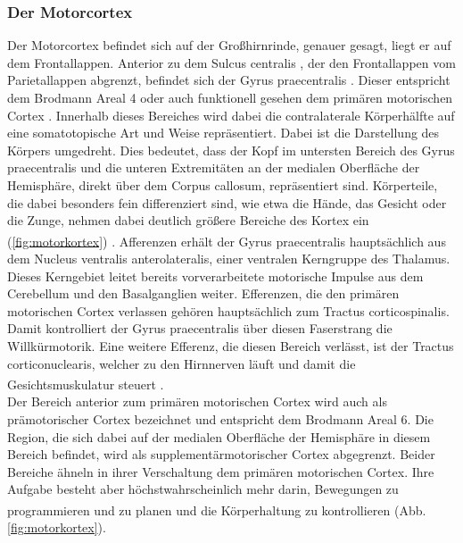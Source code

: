 \documentclass[12pt,a4paper,pdftex]{article}
\begin{document}
\subsubsection*{Der Motorcortex} 
Der Motorcortex befindet sich auf der Großhirnrinde, genauer gesagt, liegt er auf dem Frontallappen. Anterior zu dem Sulcus centralis , der den Frontallappen vom Parietallappen abgrenzt, befindet sich der Gyrus praecentralis . Dieser entspricht dem Brodmann Areal 4 oder auch funktionell gesehen dem primären motorischen Cortex . Innerhalb dieses Bereiches wird dabei die contralaterale Körperhälfte auf eine somatotopische Art und Weise repräsentiert. Dabei ist die Darstellung des Körpers umgedreht. Dies bedeutet, dass der Kopf im untersten Bereich des Gyrus praecentralis und die unteren Extremitäten an der medialen Oberfläche der Hemisphäre, direkt über dem Corpus callosum, repräsentiert sind. Körperteile, die dabei besonders fein differenziert sind, wie etwa die Hände, das Gesicht oder die Zunge, nehmen dabei deutlich größere Bereiche des Kortex ein (\ref{fig:motorkortex}) \textsuperscript{\cite[13]{crossman2014neuroanatomy}}. Afferenzen erhält der Gyrus praecentralis hauptsächlich aus dem Nucleus ventralis anterolateralis, einer ventralen Kerngruppe des Thalamus. Dieses Kerngebiet leitet bereits vorverarbeitete motorische Impulse aus dem Cerebellum und den Basalganglien weiter. Efferenzen, die den primären motorischen Cortex verlassen gehören hauptsächlich zum Tractus corticospinalis. Damit kontrolliert der Gyrus praecentralis über diesen Faserstrang die Willkürmotorik. Eine weitere Efferenz, die diesen Bereich verlässt, ist der Tractus corticonuclearis, welcher zu den Hirnnerven läuft und damit die Gesichtsmuskulatur steuert \textsuperscript{\cite[9]{trepel2011neuroanatomie}}. \\
Der Bereich anterior zum primären motorischen Cortex wird auch als prämotorischer Cortex  bezeichnet und entspricht dem Brodmann Areal 6. Die Region, die sich dabei auf der medialen Oberfläche der Hemisphäre in diesem Bereich befindet, wird als supplementärmotorischer Cortex  abgegrenzt. Beider Bereiche ähneln in ihrer Verschaltung dem primären motorischen Cortex. Ihre Aufgabe besteht aber höchstwahrscheinlich mehr darin, Bewegungen zu programmieren und zu planen und die Körperhaltung zu kontrollieren \textsuperscript{\cite[13]{crossman2014neuroanatomy}} (Abb. \ref{fig:motorkortex}). 
\end{document}
